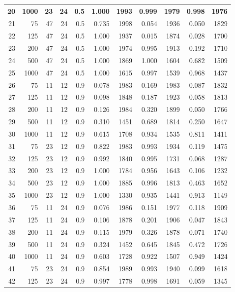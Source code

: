 \documentclass{article}
\begin{document}
\begin{tabular}{rrrrrrrrrrr}
  20 & 1000 & 23 & 24 & 0.5 & 1.000 & 1993 & 0.999 & 1979 & 0.998 & 1976 \\ 
   \hline
21 & 75 & 47 & 24 & 0.5 & 0.735 & 1998 & 0.054 & 1936 & 0.050 & 1829 \\ 
  22 & 125 & 47 & 24 & 0.5 & 1.000 & 1937 & 0.015 & 1874 & 0.028 & 1700 \\ 
  23 & 200 & 47 & 24 & 0.5 & 1.000 & 1974 & 0.995 & 1913 & 0.192 & 1710 \\ 
  24 & 500 & 47 & 24 & 0.5 & 1.000 & 1869 & 1.000 & 1604 & 0.682 & 1509 \\ 
  25 & 1000 & 47 & 24 & 0.5 & 1.000 & 1615 & 0.997 & 1539 & 0.968 & 1437 \\ 
   \hline
26 & 75 & 11 & 12 & 0.9 & 0.078 & 1983 & 0.169 & 1983 & 0.087 & 1832 \\ 
  27 & 125 & 11 & 12 & 0.9 & 0.098 & 1848 & 0.187 & 1923 & 0.058 & 1813 \\ 
  28 & 200 & 11 & 12 & 0.9 & 0.126 & 1984 & 0.320 & 1899 & 0.050 & 1766 \\ 
  29 & 500 & 11 & 12 & 0.9 & 0.310 & 1451 & 0.689 & 1814 & 0.250 & 1647 \\ 
  30 & 1000 & 11 & 12 & 0.9 & 0.615 & 1708 & 0.934 & 1535 & 0.811 & 1411 \\ 
   \hline
31 & 75 & 23 & 12 & 0.9 & 0.822 & 1983 & 0.993 & 1934 & 0.119 & 1475 \\ 
  32 & 125 & 23 & 12 & 0.9 & 0.992 & 1840 & 0.995 & 1731 & 0.068 & 1287 \\ 
  33 & 200 & 23 & 12 & 0.9 & 1.000 & 1784 & 0.956 & 1643 & 0.106 & 1232 \\ 
  34 & 500 & 23 & 12 & 0.9 & 1.000 & 1885 & 0.996 & 1813 & 0.463 & 1652 \\ 
  35 & 1000 & 23 & 12 & 0.9 & 1.000 & 1330 & 0.935 & 1441 & 0.913 & 1149 \\ 
   \hline
36 & 75 & 11 & 24 & 0.9 & 0.076 & 1986 & 0.151 & 1977 & 0.118 & 1909 \\ 
  37 & 125 & 11 & 24 & 0.9 & 0.106 & 1878 & 0.201 & 1906 & 0.047 & 1843 \\ 
  38 & 200 & 11 & 24 & 0.9 & 0.115 & 1979 & 0.326 & 1878 & 0.071 & 1740 \\ 
  39 & 500 & 11 & 24 & 0.9 & 0.324 & 1452 & 0.645 & 1845 & 0.472 & 1726 \\ 
  40 & 1000 & 11 & 24 & 0.9 & 0.603 & 1728 & 0.922 & 1507 & 0.949 & 1424 \\ 
   \hline
41 & 75 & 23 & 24 & 0.9 & 0.854 & 1989 & 0.993 & 1940 & 0.099 & 1618 \\ 
  42 & 125 & 23 & 24 & 0.9 & 0.997 & 1778 & 0.998 & 1691 & 0.059 & 1345 \\ 

\end{tabular}
\end{document}
